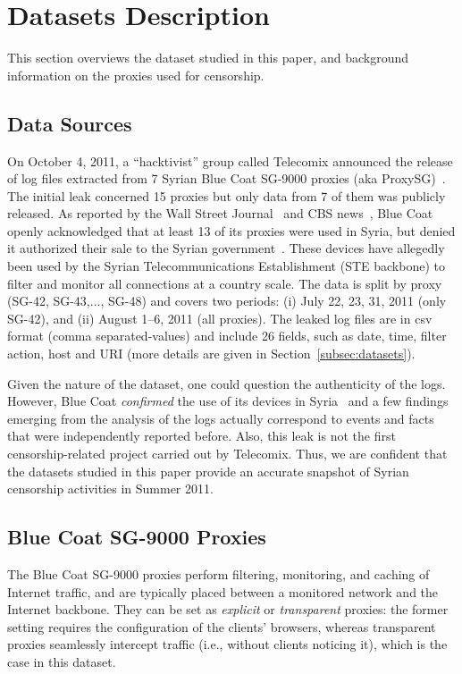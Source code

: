 \documentclass{sig-alternate-2013}
\begin{document}
 



\section{Datasets Description}\label{sec:background}



This section overviews the dataset studied in this paper, and background information on the proxies used for censorship.

\subsection{Data Sources}\label{subsec:sources}
On October 4, 2011, a ``hacktivist'' group called Telecomix announced the release of log files extracted from 7 Syrian Blue Coat SG-9000 
proxies (aka ProxySG)~\cite{leak}. The initial leak concerned 15 proxies but only data from 7 of them was publicly released. As reported by the Wall Street 
Journal~\cite{valentino} and CBS news~\cite{cbs}, Blue Coat openly acknowledged that at least 13 of its proxies were used in Syria, but denied it authorized their sale to the Syrian government~\cite{bluecoat-update}.
These devices have allegedly been used by the Syrian Telecommunications Establishment (STE backbone) to filter and monitor all  connections at a country scale. The data is split by proxy (SG-42, SG-43,$\ldots$, SG-48) and covers two periods: (i) July 22, 23, 31, 2011 (only SG-42), and (ii) August 1--6, 2011 (all proxies). 
The leaked log files are in csv format (comma separated-values) and include 26 fields, such as date, time, filter action, host and URI (more details are given in Section~\ref{subsec:datasets}).

 Given the nature of the dataset, one could question the authenticity of the logs. However,
Blue Coat {\em confirmed} the use of its devices in Syria~\cite{valentino,cbs} and a few findings emerging from the analysis of the logs actually correspond to events and facts that were independently reported before. Also, this leak is not the first censorship-related project carried out by Telecomix. Thus, we are confident that the datasets studied in this paper provide an accurate snapshot of Syrian censorship activities in Summer 2011.


\subsection{Blue Coat SG-9000 Proxies}\label{subsec:appliance}
The Blue Coat SG-9000 proxies perform filtering, monitoring, and caching of Internet traffic, and are typically placed between a monitored network and the Internet backbone. They can be set as {\em explicit} or {\em transparent} proxies: 
the former setting requires the configuration of the clients' browsers, whereas transparent proxies seamlessly intercept traffic (i.e., without clients noticing it), which is the case in this dataset.
\end{document}
